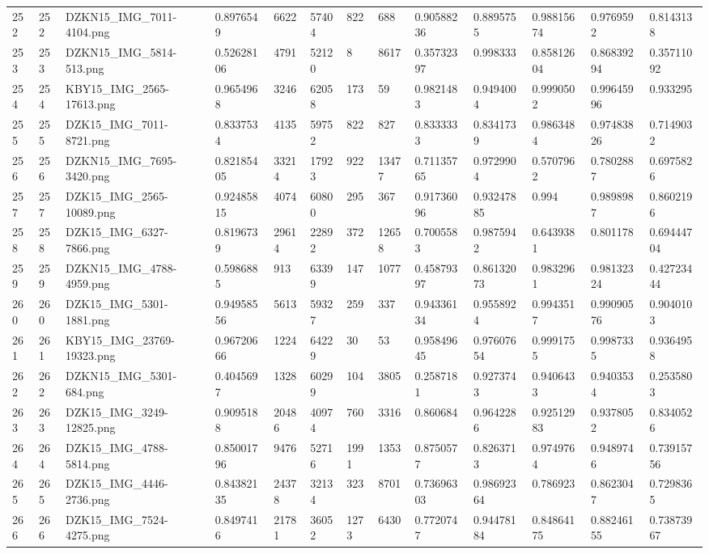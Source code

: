 \documentclass[11pt, a4paper, twoside]{report}
\begin{document}
\begin{longtable}[c]{@{}lllllllllllll@{}}
252 & 252 & DZKN15\_IMG\_7011-4104.png & 0.8976549 & 6622 & 57404 & 822 & 688 & 0.90588236 & 0.8895755 & 0.98815674 & 0.9769592 & 0.8143138 \\
253 & 253 & DZKN15\_IMG\_5814-513.png & 0.52628106 & 4791 & 52120 & 8 & 8617 & 0.35732397 & 0.998333 & 0.85812604 & 0.86839294 & 0.35711092 \\
254 & 254 & KBY15\_IMG\_2565-17613.png & 0.9654968 & 3246 & 62058 & 173 & 59 & 0.9821483 & 0.9494004 & 0.9990502 & 0.99645996 & 0.933295 \\
255 & 255 & DZK15\_IMG\_7011-8721.png & 0.8337534 & 4135 & 59752 & 822 & 827 & 0.8333333 & 0.8341739 & 0.9863484 & 0.97483826 & 0.7149032 \\
256 & 256 & DZKN15\_IMG\_7695-3420.png & 0.82185405 & 33214 & 17923 & 922 & 13477 & 0.71135765 & 0.9729904 & 0.5707962 & 0.7802887 & 0.6975826 \\
257 & 257 & DZK15\_IMG\_2565-10089.png & 0.92485815 & 4074 & 60800 & 295 & 367 & 0.91736096 & 0.93247885 & 0.994 & 0.9898987 & 0.8602196 \\
258 & 258 & DZK15\_IMG\_6327-7866.png & 0.8196739 & 29614 & 22892 & 372 & 12658 & 0.7005583 & 0.9875942 & 0.6439381 & 0.801178 & 0.69444704 \\
259 & 259 & DZKN15\_IMG\_4788-4959.png & 0.5986885 & 913 & 63399 & 147 & 1077 & 0.45879397 & 0.86132073 & 0.9832961 & 0.98132324 & 0.42723444 \\
260 & 260 & DZK15\_IMG\_5301-1881.png & 0.94958556 & 5613 & 59327 & 259 & 337 & 0.94336134 & 0.9558924 & 0.9943517 & 0.99090576 & 0.9040103 \\
261 & 261 & KBY15\_IMG\_23769-19323.png & 0.96720666 & 1224 & 64229 & 30 & 53 & 0.95849645 & 0.97607654 & 0.9991755 & 0.9987335 & 0.9364958 \\
262 & 262 & DZKN15\_IMG\_5301-684.png & 0.4045697 & 1328 & 60299 & 104 & 3805 & 0.2587181 & 0.9273743 & 0.9406433 & 0.9403534 & 0.2535803 \\
263 & 263 & DZK15\_IMG\_3249-12825.png & 0.9095188 & 20486 & 40974 & 760 & 3316 & 0.860684 & 0.9642286 & 0.92512983 & 0.9378052 & 0.8340526 \\
264 & 264 & DZK15\_IMG\_4788-5814.png & 0.85001796 & 9476 & 52716 & 1991 & 1353 & 0.8750577 & 0.8263713 & 0.9749764 & 0.9489746 & 0.73915756 \\
265 & 265 & DZK15\_IMG\_4446-2736.png & 0.84382135 & 24378 & 32134 & 323 & 8701 & 0.73696303 & 0.98692364 & 0.786923 & 0.8623047 & 0.7298365 \\
266 & 266 & DZK15\_IMG\_7524-4275.png & 0.8497416 & 21781 & 36052 & 1273 & 6430 & 0.7720747 & 0.94478184 & 0.84864175 & 0.88246155 & 0.73873967 \\

\end{longtable}
\end{document}
